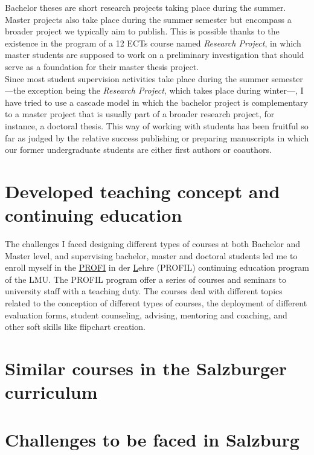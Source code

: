 \documentclass[a4paper,11pt]{article}
\begin{document}
Bachelor theses are short research projects taking place during the summer. Master projects also take place during the summer semester but encompass a broader project we typically aim to publish. This is possible thanks to the existence in the program of a 12 ECTs course named \emph{Research Project}, in which master students are supposed to work on a preliminary investigation that should serve as a foundation for their master thesis project.\\

Since most student supervision activities take place during the summer semester ---the exception being the \emph{Research Project}, which takes place during winter---, I have tried to use a cascade model in which the bachelor project is complementary to a master project that is usually part of a broader research project, for instance, a doctoral thesis. This way of working with students has been fruitful so far as judged by the relative success publishing or preparing manuscripts in which our former undergraduate students are either first authors or coauthors.

\section*{Developed teaching concept and continuing education}

The challenges I faced designing different types of courses at both Bachelor and Master level, and supervising bachelor, master and doctoral students led me to enroll myself in the \underline{PROFI} in der \underline{L}ehre (PROFIL) continuing education program of the LMU. The PROFIL program offer a series of courses and seminars to university staff with a teaching duty. The courses deal with different topics related to the conception of different types of courses, the deployment of different evaluation forms, student counseling, advising, mentoring and coaching, and other soft skills like flipchart creation.

\section*{Similar courses in the Salzburger curriculum}


\section*{Challenges to be faced in Salzburg}


\end{document}
